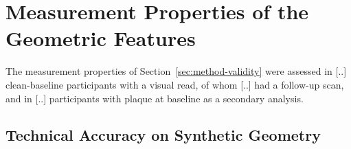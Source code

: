 \providecommand{\clarify}[1]{\textcolor{red}{\textbf{Clarification needed:} #1}}
\section{Measurement Properties of the Geometric Features}
\label{sec:results-validity}

The measurement properties of Section~\ref{sec:method-validity} were assessed in [..] clean-baseline participants with a visual read, of whom [..] had a follow-up scan, and in [..] participants with plaque at baseline as a secondary analysis.

\subsection{Technical Accuracy on Synthetic Geometry}
\label{sec:results-validity-accuracy}

